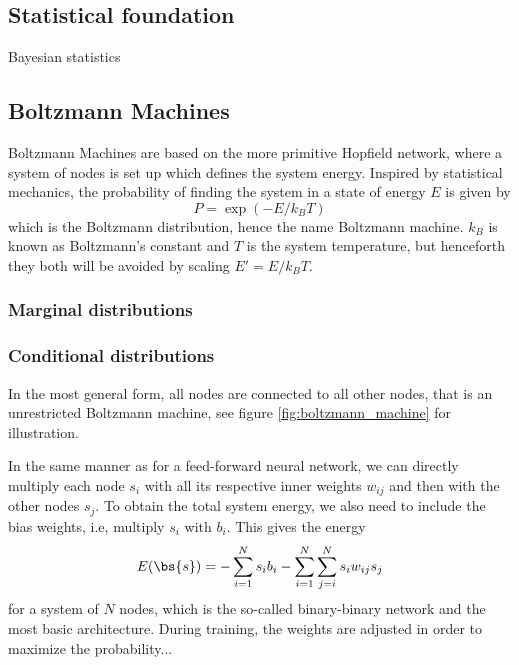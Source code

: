 \subsection{Statistical foundation}
Bayesian statistics

\subsection{Boltzmann Machines}
Boltzmann Machines are based on the more primitive Hopfield network, where a system of nodes is set up which defines the system energy. Inspired by statistical mechanics, the probability of finding the system in a state of energy $E$ is given by
\begin{equation}
P=\exp(-E/k_BT)
\end{equation}
which is the Boltzmann distribution, hence the name Boltzmann machine. $k_B$ is known as Boltzmann's constant and $T$ is the system temperature, but henceforth they both will be avoided by scaling $E'=E/k_BT$. 

\subsubsection{Marginal distributions}

\subsubsection{Conditional distributions}

In the most general form, all nodes are connected to all other nodes, that is an unrestricted Boltzmann machine, see figure \eqref{fig:boltzmann_machine} for illustration. 



In the same manner as for a feed-forward neural network, we can directly multiply each node $s_i$ with all its respective inner weights $w_{ij}$ and then with the other nodes $s_j$. To obtain the total system energy, we also need to include the bias weights, i.e, multiply $s_i$ with $b_i$. This gives the energy
\begin{equation}
E(\bs{s})=- \sum_{i=1}^Ns_ib_i-\sum_{i=1}^N\sum_{j=i}^N s_iw_{ij}s_j 
\label{eq:unrestrictedboltzmannmachine}
\end{equation}
for a system of $N$ nodes, which is the so-called binary-binary network and the most basic architecture. During training, the weights are adjusted in order to maximize the probability...

